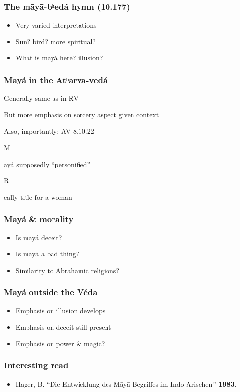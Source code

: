 \documentclass[pdf]{beamer}
\newcommand{\Subitem}[1]{{\setlength\itemindent{12pt} \item[-] #1}}
\begin{document}
\begin{frame} \frametitle{The māyā-bʰedá hymn (10.177)}
\begin{itemize}
	\item Very varied interpretations
	\item Sun? bird? more spiritual?
	\item What is māyā́ here? illusion?
\end{itemize}
\end{frame}

\begin{frame} \frametitle{Māyā́ in the Atʰarva-vedá}
\begin{itemize}
	\item Generally same as in R̥V
	\item But more emphasis on sorcery aspect given context
	\item Also, importantly: AV 8.10.22
	\Subitem Māyā́ supposedly ``personified''
	\Subitem Really title for a woman
\end{itemize}
\end{frame}

\begin{frame} \frametitle{Māyā́ \& morality}
\begin{itemize}
	\item Is māyā́ deceit?
	\item Is māyā́ a bad thing?
	\item Similarity to Abrahamic religions?
\end{itemize}
\end{frame}

\begin{frame} \frametitle{Māyā́ outside the Véda}
\begin{itemize}
	\item Emphasis on illusion develops
	\item Emphasis on deceit still present
	\item Emphasis on power \& magic?
\end{itemize}
\end{frame}


\begin{frame} \frametitle{Interesting read}
\begin{itemize}
	\item Hager, B. ``Die Entwicklung des Māyā-Begriffes im Indo-Arischen.'' \textbf{1983}.
\end{itemize}
\end{frame}
\end{document}

